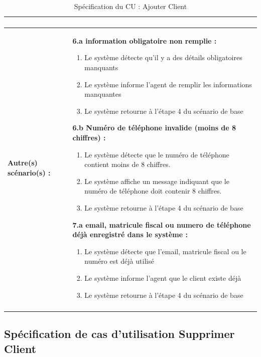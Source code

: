 \begin{longtable}{|>{\bfseries}p{3.5cm}|p{\dimexpr\textwidth-3.5cm-4\tabcolsep-2\arrayrulewidth}|}
\begin{enumerate}[leftmargin=1.5em, topsep=2pt, itemsep=1pt]
\end{enumerate} \\
\hline
Autre(s) scénario(s) : &
\textbf{6.a information obligatoire non remplie :}
\begin{enumerate}[leftmargin=1.5em, topsep=2pt, itemsep=1pt]
  \item Le système détecte qu'il y a des détails obligatoires manquants
  \item Le système informe l'agent de remplir les informations manquantes
  \item Le système retourne à l'étape 4 du scénario de base
\end{enumerate}
\textbf{6.b Numéro de téléphone invalide (moins de 8 chiffres) :}
\begin{enumerate}[leftmargin=1.5em, topsep=2pt, itemsep=1pt]
  \item Le système détecte que le numéro de téléphone contient moins de 8 chiffres.
  \item Le système affiche un message indiquant que le numéro de téléphone doit contenir 8 chiffres.
  \item Le système retourne à l'étape 4 du scénario de base
\end{enumerate}
\textbf{7.a email, matricule fiscal ou numero de téléphone déjà enregistré dans le système :}
\begin{enumerate}[leftmargin=1.5em, topsep=2pt, itemsep=1pt]
  \item Le système détecte que l'email, matricule fiscal ou le numéro est déjà utilisé
  \item Le système informe l'agent que le client existe déjà
  \item Le système retourne à l'étape 4 du scénario de base
\end{enumerate} \\
\hline
\caption{Spécification du CU : Ajouter Client}
\label{tab:cu-ajouter-client}
\end{longtable}

\newpage
\subsection{Spécification de cas d'utilisation Supprimer Client}

